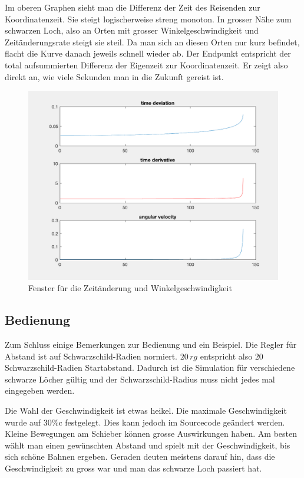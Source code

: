 \begin{refsection}
    Im oberen Graphen sieht man die Differenz der Zeit des Reisenden zur Koordinatenzeit. Sie steigt logischerweise streng monoton. In grosser Nähe zum schwarzen Loch, also an Orten mit grosser Winkelgeschwindigkeit und Zeitänderungsrate steigt sie steil. Da man sich an diesen Orten nur kurz befindet, flacht die Kurve danach jeweils schnell wieder ab. Der Endpunkt entspricht der total aufsummierten Differenz der Eigenzeit zur Koordinatenzeit. Er zeigt also direkt an, wie viele Sekunden man in die Zukunft gereist ist.
      \begin{figure}
        \centering
        \includegraphics[width=12cm]{zeitreisen/time.png}
        \caption{Fenster für die Zeitänderung und Winkelgeschwindigkeit}
        \label{skript:zeitreisen:fig:time} 
    \end{figure}
    
    \subsection{Bedienung}
    
    Zum Schluss einige Bemerkungen zur Bedienung und ein Beispiel. 
    Die Regler für Abstand ist auf Schwarzschild-Radien normiert. $20\,rg$ entspricht also $20$ Schwarzschild-Radien Startabstand. Dadurch ist die Simulation für verschiedene schwarze Löcher gültig und der Schwarzschild-Radius muss nicht jedes mal eingegeben werden.
    
    Die Wahl der Geschwindigkeit ist etwas heikel. Die maximale Geschwindigkeit wurde auf 30\%c festgelegt. Dies kann jedoch im Sourcecode geändert werden. Kleine Bewegungen am Schieber können grosse Auswirkungen haben. Am besten wählt man einen gewünschten Abstand und spielt mit der Geschwindigkeit, bis sich schöne Bahnen ergeben. Geraden deuten meistens darauf hin, dass die Geschwindigkeit zu gross war und man das schwarze Loch passiert hat.
    

\end{refsection}

